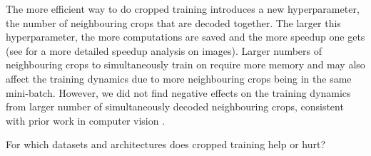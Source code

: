     The more efficient way to do cropped training introduces a new
hyperparameter, the number of neighbouring crops that are decoded
together. The larger this hyperparameter, the more computations are
saved and the more speedup one gets (see
\citet{giusti_fast_2013} for a more detailed speedup analysis
on images). Larger numbers of neighbouring crops to simultaneously train
on require more memory and may also affect the training dynamics due to
more neighbouring crops being in the same mini-batch. However, we did
not find negative effects on the training dynamics from larger number of
simultaneously decoded neighbouring crops, consistent with prior work in
computer vision \citep{shelhamer_fully_2016}.

\begin{openbox}
\item For which datasets and architectures does cropped training help or hurt? 
\end{openbox}
